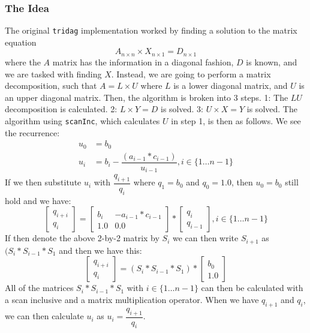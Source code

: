 \documentclass[12pt, oneside]{article}
\begin{document}
\subsubsection{The Idea}
The original \texttt{tridag} implementation worked by finding a solution to the matrix equation \[A_{n\times n}\times X_{n \times 1} = D_{n \times 1}\]
where the \(A\) matrix has the information in a diagonal fashion, \(D\) is known, and we are tasked with finding \(X\). Instead, we are going to perform a matrix decomposition, such that \(A = L \times U\) where \(L\) is a lower diagonal matrix, and \(U\) is an upper diagonal matrix. Then, the algorithm is broken into 3 steps. 1: The \(LU\) decomposition is calculated. 2: \(L \times Y = D\) is solved. 3: \(U \times X = Y\) is solved. The algorithm using \texttt{scanInc}, which calculates \(U\) in step 1, is then as follows.
We see the recurrence:
\begin{align*}
    u_0 &= b_0 \\
    u_i &= b_i - \dfrac{(a_{i - 1} * c_{i - 1})}{u_{i-1}}, i \in \{1 \ldots n-1\}
\end{align*}
If we then substitute $u_i$ with $\dfrac{q_{i+1}}{q_i}$ where $q_1 = b_0$ and
$q_0 = 1.0$, then $u_0 = b_0$ still hold and we have:
\begin{equation*}
    \begin{bmatrix}
        q_{i+i} \\
        q_i
    \end{bmatrix}
    =
    \begin{bmatrix}
        b_i & -a_{i - 1} * c_{i - 1} \\
        1.0 & 0.0
    \end{bmatrix}
    *
    \begin{bmatrix}
        q_{i} \\
        q_{i - 1}
    \end{bmatrix}
    , i \in \{1 \ldots n-1\}
\end{equation*}
If then denote the above 2-by-2 matrix by $S_i$ we can then write $S_{i + 1}$ as
$(S_i * S_{i - 1} * S_1$ and then we have this:
\begin{equation*}
    \begin{bmatrix}
        q_{i+i} \\
        q_i
    \end{bmatrix}
    =
    (S_i * S_{i - 1} * S_1)
    *
    \begin{bmatrix}
        b_{0} \\
        1.0
    \end{bmatrix}
\end{equation*}
All of the matrices $S_i * S_{i - 1} * S_1$ with $i \in \{1 \ldots n-1\}$ can
then be calculated with a scan inclusive and a matrix multiplication operator.
When we have $q_{i+1}$ and $q_i$, we can then calculate $u_i$ as
$u_i = \dfrac{q_{i+1}}{q_i}$.
\end{document}
